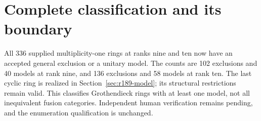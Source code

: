 \section{Complete classification and its boundary}
All 336 supplied multiplicity-one rings at ranks nine and ten now have
an accepted general exclusion or a unitary model. The counts are 102
exclusions and 40 models at rank nine, and 136 exclusions and 58 models
at rank ten. The last cyclic ring is realized in
Section~\ref{sec:r189-model}; its structural restrictions remain valid.
This classifies Grothendieck rings with at least one model, not all
inequivalent fusion categories. Independent human verification remains
pending, and the enumeration qualification is unchanged.
